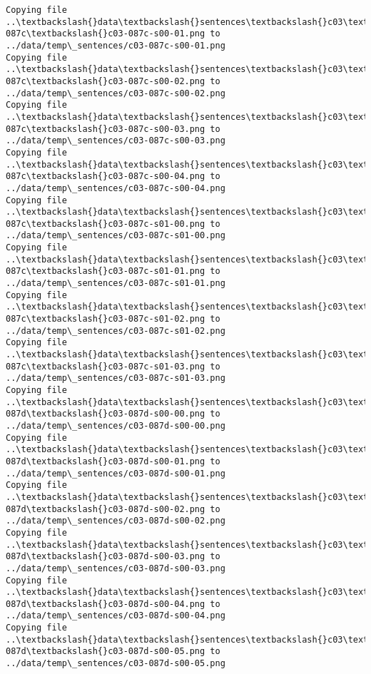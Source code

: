 \documentclass[11pt]{article}
\begin{document}
\begin{Verbatim}[commandchars=\\\{\}]
Copying file ..\textbackslash{}data\textbackslash{}sentences\textbackslash{}c03\textbackslash{}c03-087c\textbackslash{}c03-087c-s00-01.png to
../data/temp\_sentences/c03-087c-s00-01.png
Copying file ..\textbackslash{}data\textbackslash{}sentences\textbackslash{}c03\textbackslash{}c03-087c\textbackslash{}c03-087c-s00-02.png to
../data/temp\_sentences/c03-087c-s00-02.png
Copying file ..\textbackslash{}data\textbackslash{}sentences\textbackslash{}c03\textbackslash{}c03-087c\textbackslash{}c03-087c-s00-03.png to
../data/temp\_sentences/c03-087c-s00-03.png
Copying file ..\textbackslash{}data\textbackslash{}sentences\textbackslash{}c03\textbackslash{}c03-087c\textbackslash{}c03-087c-s00-04.png to
../data/temp\_sentences/c03-087c-s00-04.png
Copying file ..\textbackslash{}data\textbackslash{}sentences\textbackslash{}c03\textbackslash{}c03-087c\textbackslash{}c03-087c-s01-00.png to
../data/temp\_sentences/c03-087c-s01-00.png
Copying file ..\textbackslash{}data\textbackslash{}sentences\textbackslash{}c03\textbackslash{}c03-087c\textbackslash{}c03-087c-s01-01.png to
../data/temp\_sentences/c03-087c-s01-01.png
Copying file ..\textbackslash{}data\textbackslash{}sentences\textbackslash{}c03\textbackslash{}c03-087c\textbackslash{}c03-087c-s01-02.png to
../data/temp\_sentences/c03-087c-s01-02.png
Copying file ..\textbackslash{}data\textbackslash{}sentences\textbackslash{}c03\textbackslash{}c03-087c\textbackslash{}c03-087c-s01-03.png to
../data/temp\_sentences/c03-087c-s01-03.png
Copying file ..\textbackslash{}data\textbackslash{}sentences\textbackslash{}c03\textbackslash{}c03-087d\textbackslash{}c03-087d-s00-00.png to
../data/temp\_sentences/c03-087d-s00-00.png
Copying file ..\textbackslash{}data\textbackslash{}sentences\textbackslash{}c03\textbackslash{}c03-087d\textbackslash{}c03-087d-s00-01.png to
../data/temp\_sentences/c03-087d-s00-01.png
Copying file ..\textbackslash{}data\textbackslash{}sentences\textbackslash{}c03\textbackslash{}c03-087d\textbackslash{}c03-087d-s00-02.png to
../data/temp\_sentences/c03-087d-s00-02.png
Copying file ..\textbackslash{}data\textbackslash{}sentences\textbackslash{}c03\textbackslash{}c03-087d\textbackslash{}c03-087d-s00-03.png to
../data/temp\_sentences/c03-087d-s00-03.png
Copying file ..\textbackslash{}data\textbackslash{}sentences\textbackslash{}c03\textbackslash{}c03-087d\textbackslash{}c03-087d-s00-04.png to
../data/temp\_sentences/c03-087d-s00-04.png
Copying file ..\textbackslash{}data\textbackslash{}sentences\textbackslash{}c03\textbackslash{}c03-087d\textbackslash{}c03-087d-s00-05.png to
../data/temp\_sentences/c03-087d-s00-05.png

\end{Verbatim}
\end{document}
